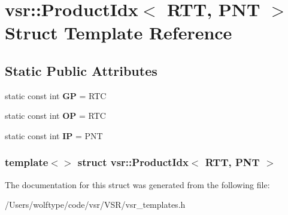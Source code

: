 \hypertarget{structvsr_1_1_product_idx_3_01_r_t_t_00_01_p_n_t_01_4}{\section{vsr\-:\-:Product\-Idx$<$ R\-T\-T, P\-N\-T $>$ Struct Template Reference}
\label{structvsr_1_1_product_idx_3_01_r_t_t_00_01_p_n_t_01_4}
}
\subsection*{Static Public Attributes}
\begin{DoxyCompactItemize}
\item 
\hypertarget{structvsr_1_1_product_idx_3_01_r_t_t_00_01_p_n_t_01_4_aaed7355a2bca27fad5bbd34d2a71bc77}{static const int {\bfseries G\-P} = R\-T\-C}\label{structvsr_1_1_product_idx_3_01_r_t_t_00_01_p_n_t_01_4_aaed7355a2bca27fad5bbd34d2a71bc77}

\item 
\hypertarget{structvsr_1_1_product_idx_3_01_r_t_t_00_01_p_n_t_01_4_af8250999bc0c6c34c5c983691076e3a7}{static const int {\bfseries O\-P} = R\-T\-C}\label{structvsr_1_1_product_idx_3_01_r_t_t_00_01_p_n_t_01_4_af8250999bc0c6c34c5c983691076e3a7}

\item 
\hypertarget{structvsr_1_1_product_idx_3_01_r_t_t_00_01_p_n_t_01_4_acbfe66aab75062f4fd456dac26e35294}{static const int {\bfseries I\-P} = P\-N\-T}\label{structvsr_1_1_product_idx_3_01_r_t_t_00_01_p_n_t_01_4_acbfe66aab75062f4fd456dac26e35294}

\end{DoxyCompactItemize}
\subsubsection*{template$<$$>$ struct vsr\-::\-Product\-Idx$<$ R\-T\-T, P\-N\-T $>$}



The documentation for this struct was generated from the following file\-:\begin{DoxyCompactItemize}
\item 
/\-Users/wolftype/code/vsr/\-V\-S\-R/vsr\-\_\-templates.\-h\end{DoxyCompactItemize}
